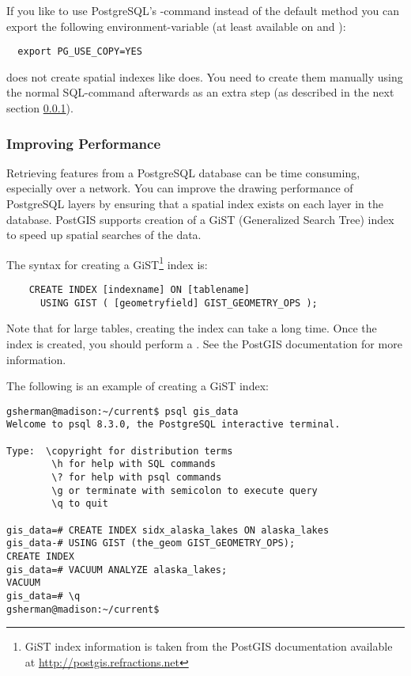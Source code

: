 If you like to use PostgreSQL's -command instead of the default
 method you can export the following
environment-variable (at least available on \nix and \osx):
\begin{verbatim}
  export PG_USE_COPY=YES
\end{verbatim}

 does not create spatial indexes like 
does. You need to create them manually using the normal SQL-command
 afterwards as an extra step (as described in the next
section \ref{label_improve}).

\subsubsection{Improving Performance} \label{label_improve}

Retrieving features from a PostgreSQL database can be time consuming,
especially over a network. You can improve the drawing performance of
PostgreSQL layers by ensuring that a  spatial
index
exists on each layer in the database. PostGIS supports creation of a
 GiST
(Generalized Search Tree) index to speed up spatial searches of the data.

The syntax for creating a GiST\footnote{GiST index information is taken from the PostGIS
documentation available at \url{http://postgis.refractions.net}}
index is:

\begin{verbatim}
    CREATE INDEX [indexname] ON [tablename] 
      USING GIST ( [geometryfield] GIST_GEOMETRY_OPS );
\end{verbatim}

Note that for large tables, creating the index can take a long time. Once the
index is created, you should perform a . See the
PostGIS documentation \cite{PostGISweb} for more information.

The following is an example of creating a GiST index:
\begin{verbatim}
gsherman@madison:~/current$ psql gis_data
Welcome to psql 8.3.0, the PostgreSQL interactive terminal.

Type:  \copyright for distribution terms
        \h for help with SQL commands
        \? for help with psql commands
        \g or terminate with semicolon to execute query
        \q to quit

gis_data=# CREATE INDEX sidx_alaska_lakes ON alaska_lakes
gis_data-# USING GIST (the_geom GIST_GEOMETRY_OPS);
CREATE INDEX
gis_data=# VACUUM ANALYZE alaska_lakes;
VACUUM
gis_data=# \q
gsherman@madison:~/current$
\end{verbatim}


